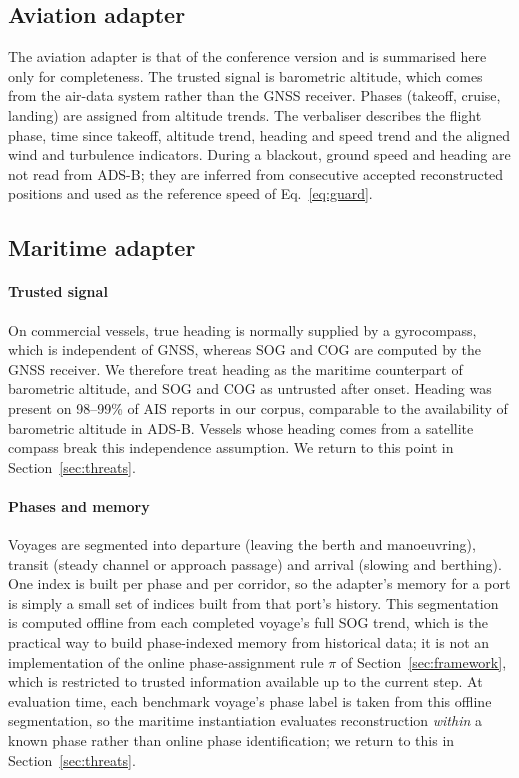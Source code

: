 \subsection{Aviation adapter}

The aviation adapter is that of the conference version
\citep{felendler2026trajrag} and is summarised here only for completeness.
The trusted signal is barometric altitude, which comes from the air-data
system rather than the GNSS receiver. Phases (takeoff, cruise, landing) are
assigned from altitude trends. The verbaliser describes the flight phase,
time since takeoff, altitude trend, heading and speed trend and the aligned
wind and turbulence indicators. During a blackout, ground speed and heading
are not read from ADS-B; they are inferred from consecutive accepted
reconstructed positions and used as the reference speed of
Eq.~\eqref{eq:guard}.

\subsection{Maritime adapter}
\label{sec:maritime-adapter}

\paragraph{Trusted signal} On commercial vessels, true heading is normally
supplied by a gyrocompass, which is independent of GNSS, whereas SOG and COG
are computed by the GNSS receiver. We therefore treat heading as the
maritime counterpart of barometric altitude, and SOG and COG as untrusted
after onset. Heading was present on 98--99\% of AIS reports in our corpus,
comparable to the availability of barometric altitude in ADS-B. Vessels
whose heading comes from a satellite compass break this independence
assumption. We return to this point in Section~\ref{sec:threats}.

\paragraph{Phases and memory} Voyages are segmented into departure (leaving
the berth and manoeuvring), transit (steady channel or approach passage) and
arrival (slowing and berthing). One index is built per phase and per
corridor, so the adapter's memory for a port is simply a small set of
indices built from that port's history. This segmentation is computed
offline from each completed voyage's full SOG trend, which is the practical
way to build phase-indexed memory from historical data; it is not an
implementation of the online phase-assignment rule $\pi$ of
Section~\ref{sec:framework}, which is restricted to trusted information
available up to the current step. At evaluation time, each benchmark
voyage's phase label is taken from this offline segmentation, so the
maritime instantiation evaluates reconstruction \emph{within} a known phase
rather than online phase identification; we return to this in
Section~\ref{sec:threats}.

